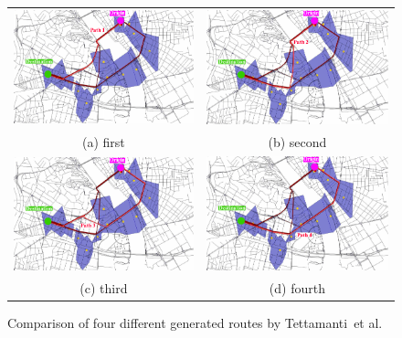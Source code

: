 \documentclass[master,english]{hgbthesis}
\begin{document}
\begin{figure}
\begin{tabular}{cc}
  \includegraphics[width=65mm]{tattipath0.pdf} &   \includegraphics[width=65mm]{tattipath1.pdf} \\
(a) first & (b) second \\[6pt]
 \includegraphics[width=65mm]{tattipath2.pdf} &   \includegraphics[width=65mm]{tattipath3.pdf} \\
(c) third & (d) fourth \\[6pt]
\end{tabular}
\caption{Comparison of four different generated routes by Tettamanti~et al.\ \cite{Tettamanti2012}}
\label{fig:tettaroutes}
\end{figure}
\end{document}
